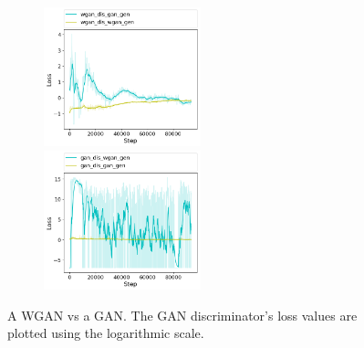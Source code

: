 \begin{figure}[h!]
\begin{subfigure}[b]{\textwidth}
	\end{subfigure}
	\begin{subfigure}[b]{\textwidth}		
		\includegraphics[width=0.5\textwidth]{figures/cross_dis/trial16_wgan_dis_gan_gen}
		\includegraphics[width=0.5\textwidth]{figures/cross_dis/trial16_gan_dis_wgan_gen}
	\end{subfigure}
		\caption{A WGAN vs a GAN. The GAN discriminator's loss values are plotted using the logarithmic scale.}
\end{figure}

